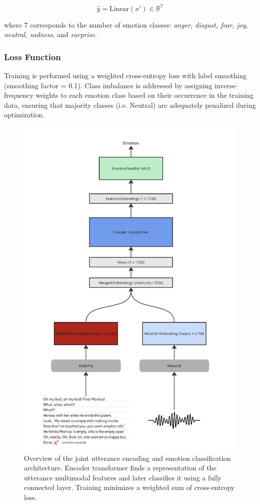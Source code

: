 \documentclass{article}
\begin{document}
$$\hat{y} = \text{Linear}(x') \in \mathbb{R}^{7}$$

where 7 corresponds to the number of emotion classes: \textit{anger, disgust, fear, joy, neutral, sadness}, and \textit{surprise}.

\subsubsection{Loss Function}
Training is performed using a weighted cross-entropy loss with label smoothing (smoothing factor = 0.1). Class imbalance is addressed by assigning inverse-frequency weights to each emotion class based on their occurrence in the training data, ensuring that majority classes (i.e. Neutral) are adequately penalized during optimization.

\begin{figure}
  \centering
  \includegraphics[width=0.8\linewidth]{Images/transformer_encoder.png}
  \caption{Overview of the joint utterance encoding and emotion classification architecture. Encoder transformer finds a representation of the utterance multimodal features and later classifies it using a fully connected layer. Training minimizes a weighted sum of cross-entropy loss.}
  \label{fig:transf-dec}
\end{figure}
\end{document}
